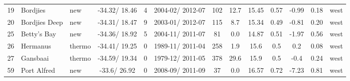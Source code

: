 \documentclass{ametsoc}
\begin{document}
\begin{table}[ht]
\begin{tabular}{cllcccccccccc}
   19 & Bordjies & new & -34.32/ 18.46 &   4 & 2004-02/ 2012-07 & 102 & 12.7 & 15.45 & 0.57 & -0.99 & 0.18 & west \\
   20 & Bordjies Deep & new & -34.31/ 18.47 &   9 & 2003-01/ 2012-07 & 115 & 8.7 & 15.34 & 0.49 & -0.81 & 0.20 & west \\
   25 & Betty's Bay & new & -34.36/ 18.92 &   5 & 2004-11/ 2011-07 &  81 & 0.0 & 14.87 & 0.51 & -1.97 & 0.56 & west \\
   26 & Hermanus & thermo & -34.41/ 19.25 &   0 & 1989-11/ 2011-04 & 258 & 1.9 & 15.6 & 0.5 & 0.2 & 0.08 & west \\
   27 & Gansbaai & thermo & -34.59/ 19.34 &   0 & 1979-12/ 2011-05 & 378 & 29.6 & 15.9 & 0.5 & -0.4 & 0.24 & west \\
   59 & Port Alfred & new & -33.6/ 26.92 &   0 & 2008-09/ 2011-09 &  37 & 0.0 & 16.57 & 0.72 & -7.23 & 0.81 & west \\
  \hline
  \end{tabular}
\end{table}
\end{document}

